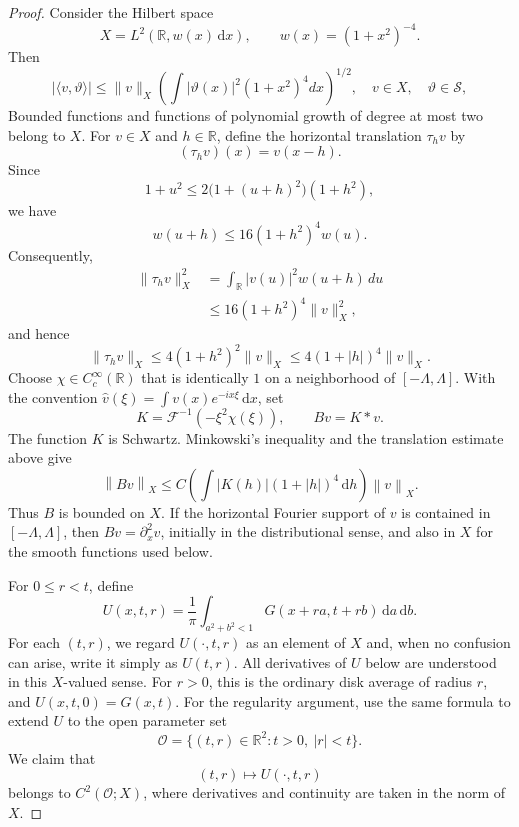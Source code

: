\documentclass[10pt,a4paper]{amsart}
\newcommand{\dd}{\,\mathrm d}
\newcommand{\norm}[1]{\left\lVert#1\right\rVert}
\begin{document}
\begin{proof}
\medskip
Consider the Hilbert space
\[
X=L^2(\mathbb R,w(x)\dd x),\qquad w(x)=(1+x^2)^{-4}.
\]
Then
\[
|\langle v,\vartheta\rangle|
\le\|v\|_X\left(\int|\vartheta(x)|^2(1+x^2)^4dx\right)^{1/2}, \quad v \in X,
\quad\vartheta\in\mathcal S,
\]
Bounded functions and functions of polynomial growth of degree at most two belong to $X$.
For $v\in X$ and $h\in\mathbb R$, define the horizontal
translation $\tau_hv$ by
\[
(\tau_hv)(x)=v(x-h).
\]
Since
\[
1+u^2\le 2\bigl(1+(u+h)^2\bigr)(1+h^2),
\]
we have
\[
w(u+h)\le 16(1+h^2)^4w(u).
\]
Consequently,
\[
\begin{aligned}
\|\tau_hv\|_X^2
&=\int_{\mathbb R}|v(u)|^2w(u+h)\,du\\
&\le 16(1+h^2)^4\|v\|_X^2,
\end{aligned}
\]
and hence
\[
\|\tau_hv\|_X
\le 4(1+h^2)^2\|v\|_X
\le 4(1+|h|)^4\|v\|_X.
\]
Choose $\chi\in C_c^\infty(\mathbb R)$ that is identically $1$ on a neighborhood of $[-\Lambda,\Lambda]$.
With the convention $\widehat v(\xi)=\int v(x)e^{-ix\xi}\dd x$, set
\[
K=\mathcal F^{-1}(-\xi^2\chi(\xi)),\qquad Bv=K*v.
\]
The function $K$ is Schwartz. Minkowski's inequality and the translation estimate above give
\[
\norm{Bv}_X\le
C\left(\int|K(h)|(1+|h|)^4\dd h\right)\norm v_X.
\]
Thus $B$ is bounded on $X$. If the horizontal Fourier support of $v$ is contained in
$[-\Lambda,\Lambda]$, then $Bv=\partial_x^2v$, initially in the distributional sense,
and also in $X$ for the smooth functions used below. 

\medskip
For $0\le r<t$, define
\[
U(x,t,r)=\frac1\pi\int_{a^2+b^2<1}G(x+ra,t+rb)\dd a\dd b.
\]
For each $(t,r)$, we regard $U(\cdot,t,r)$ as an element of $X$ and,
when no confusion can arise, write it simply as $U(t,r)$. All derivatives of
$U$ below are understood in this $X$-valued sense.
For $r>0$, this is the ordinary disk average of radius $r$,
and $U(x,t,0)=G(x,t)$.
For the regularity argument, use the same formula to extend
$U$ to the open parameter set
\[
\mathcal O=\{(t,r)\in\mathbb R^2:t>0,\ |r|<t\}.
\]
We claim that
\[
(t,r)\longmapsto U(\cdot,t,r)
\]
belongs to $C^2(\mathcal O;X)$, where derivatives and continuity
are taken in the norm of $X$.


\end{proof}
\end{document}
